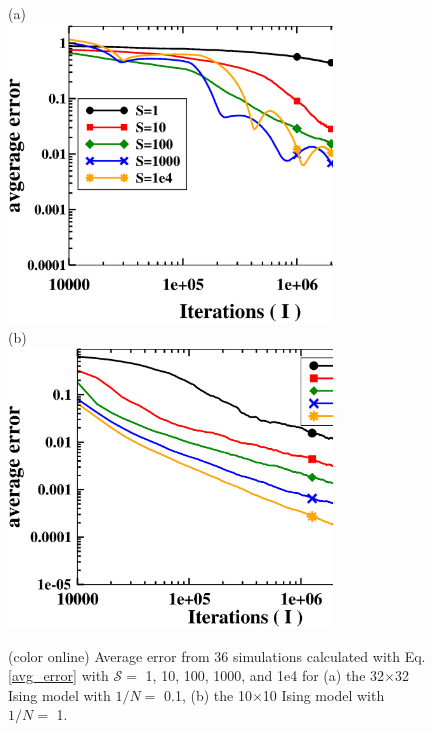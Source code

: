 \documentclass[aps,pre,reprint,superscriptaddress,showkeys]{revtex4-1}
\begin{document}
\begin{figure}[h!]
(a)\\
\includegraphics[width=8.6cm]{fig1a.eps}\\
(b)\\
\includegraphics[width=8.6cm]{fig1b.eps}
\caption{(color online) Average error from 36 simulations calculated with Eq. \ref{avg_error} with $\mathcal{S}=$ 1, 10, 100, 1000, and 1e4 for  (a) the 32$\times$32 Ising model with $1/N=$ 0.1, (b) the 10$\times$10 Ising model with $1/N =$ 1. \label{thirtytwo_Stest} }
\end{figure}
\end{document}

